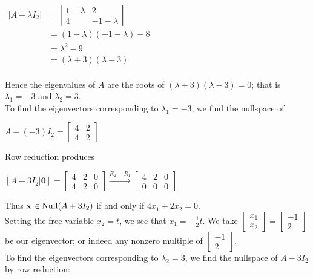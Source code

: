 \documentclass[
  letterpaper,
  DIV=11,
  numbers=noendperiod]{scrartcl}
\theoremstyle{remark}
\begin{document}
\(\begin{alignedat}{2}
        |A - \lambda I_{2}| &= \left|\begin{array}{cc}
            1 - \lambda & 2 \\
            4 & -1-\lambda
        \end{array}\right| \\
        {} &= (1-\lambda )(-1-\lambda ) - 8 \\
        {} &= \lambda ^{2} - 9 \\
        {} &= (\lambda + 3)(\lambda - 3). \\
    \end{alignedat}\)

Hence the eigenvalues of \(A\) are the roots of
\((\lambda + 3)(\lambda - 3) = 0\); that is \(\lambda _{1} = -3\) and
\(\lambda _{2} = 3\).\\
To find the eigenvectors corresponding to \(\lambda _{1} = -3\), we find
the nullspace of

\(A - (-3)I_{2} = \left[\begin{array}{cc} 4 & 2 \\ 4 & 2 \end{array}\right]\)

Row reduction produces

\(\left[A+3I_{2} | \mathbf{0}\right] = \left[\begin{array}{cc|c} 4 & 2 & 0 \\ 4 & 2 & 0 \end{array}\right] \xrightarrow{R_{2} - R_{1}} \left[\begin{array}{cc|c} 4 & 2 & 0 \\ 0 & 0 & 0 \end{array}\right]\)

Thus \(\mathbf{x} \in {\rm Null}(A+3I_{2})\) if and only if
\(4x_{1} + 2x_{2} = 0\).\\
Setting the free variable \(x_{2} = t\), we see that
\(x_{1} = -\frac{1}{2}t\). We take
\(\left[\begin{array}{c} x_{1} \\ x_{2} \end{array}\right] = \left[\begin{array}{c} -1 \\ 2 \end{array}\right]\)
be our eigenvector; or indeed any nonzero multiple of
\(\left[\begin{array}{c} -1 \\ 2 \end{array}\right]\).\\
To find the eigenvectors corresponding to \(\lambda _{2} = 3\), we find
the nullspace of \(A - 3I_{2}\) by row reduction:
\end{document}

